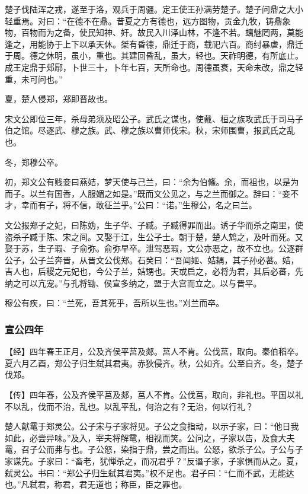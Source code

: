 \documentclass[]{article}
\begin{document}
楚子伐陆浑之戎，遂至于洛，观兵于周疆。定王使王孙满劳楚子。楚子问鼎之大小轻重焉。对曰：``在德不在鼎。昔夏之方有德也，远方图物，贡金九牧，铸鼎象物，百物而为之备，使民知神、奸。故民入川泽山林，不逢不若。螭魅罔两，莫能逢之，用能协于上下以承天休。桀有昏德，鼎迁于商，载祀六百。商纣暴虐，鼎迁于周。德之休明，虽小，重也。其建回昏乱，虽大，轻也。天祚明德，有所底止。成王定鼎于郏鄏，卜世三十，卜年七百，天所命也。周德虽衰，天命未改，鼎之轻重，未可问也。''

夏，楚人侵郑，郑即晋故也。

宋文公即位三年，杀母弟须及昭公子。武氏之谋也，使戴、桓之族攻武氏于司马子伯之馆。尽逐武、穆之族。武、穆之族以曹师伐宋。秋，宋师围曹，报武氏之乱也。

冬，郑穆公卒。

初，郑文公有贱妾曰燕姞，梦天使与己兰，曰：``余为伯鯈。余，而祖也，以是为而子。以兰有国香，人服媚之如是。''既而文公见之，与之兰而御之。辞曰：``妾不才，幸而有子，将不信，敢征兰乎。''公曰：``诺。''生穆公，名之曰兰。

文公报郑子之妃，曰陈妫，生子华、子臧。子臧得罪而出。诱子华而杀之南里，使盗杀子臧于陈、宋之间。又娶于江，生公子士。朝于楚，楚人鸩之，及叶而死。又娶于苏，生子瑕、子俞弥。俞弥早卒。泄驾恶瑕，文公亦恶之，故不立也。公逐群公子，公子兰奔晋，从晋文公伐郑。石癸曰：``吾闻姬、姞耦，其子孙必蕃。姞，吉人也，后稷之元妃也，今公子兰，姞甥也。天或启之，必将为君，其后必蕃，先纳之可以亢宠。''与孔将锄、侯宣多纳之，盟于大宫而立之。以与晋平。

穆公有疾，曰：``兰死，吾其死乎，吾所以生也。''刈兰而卒。

\hypertarget{header-n1335}{%
\subsubsection{宣公四年}\label{header-n1335}}

【经】四年春王正月，公及齐侯平莒及郯。莒人不肯。公伐莒，取向。秦伯稻卒。夏六月乙酉，郑公子归生弑其君夷。赤狄侵齐。秋，公如齐。公至自齐。冬，楚子伐郑。

【传】四年春，公及齐侯平莒及郯，莒人不肯。公伐莒，取向，非礼也。平国以礼不以乱，伐而不治，乱也。以乱平乱，何治之有？无治，何以行礼？

楚人献鼋于郑灵公。公子宋与子家将见。子公之食指动，以示子家，曰：``他日我如此，必尝异味。''及入，宰夫将解鼋，相视而笑。公问之，子家以告，及食大夫鼋，召子公而弗与也。子公怒，染指于鼎，尝之而出。公怒，欲杀子公。子公与子家谋先。子家曰：``畜老，犹惮杀之，而况君乎？''反谮子家，子家惧而从之。夏，弑灵公。书曰：``郑公子归生弑其君夷。''权不足也。君子曰：``仁而不武，无能达也。''凡弑君，称君，君无道也；称臣，臣之罪也。
\end{document}
